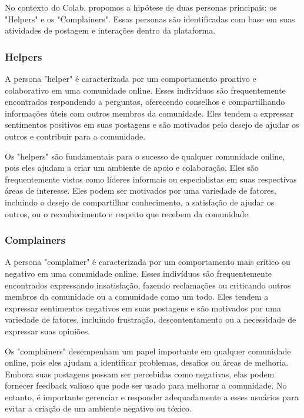No contexto do Colab, propomos a hipótese de duas personas principais: os "Helpers" e os "Complainers". Essas personas são identificadas com base em suas atividades de postagem e interações dentro da plataforma.

\subsubsection*{Helpers}

A persona "helper" é caracterizada por um comportamento proativo e colaborativo em uma comunidade online. Esses indivíduos são frequentemente encontrados respondendo a perguntas, oferecendo conselhos e compartilhando informações úteis com outros membros da comunidade. Eles tendem a expressar sentimentos positivos em suas postagens e são motivados pelo desejo de ajudar os outros e contribuir para a comunidade.

Os "helpers" são fundamentais para o sucesso de qualquer comunidade online, pois eles ajudam a criar um ambiente de apoio e colaboração. Eles são frequentemente vistos como líderes informais ou especialistas em suas respectivas áreas de interesse. Eles podem ser motivados por uma variedade de fatores, incluindo o desejo de compartilhar conhecimento, a satisfação de ajudar os outros, ou o reconhecimento e respeito que recebem da comunidade.

\subsubsection*{Complainers}

A persona "complainer" é caracterizada por um comportamento mais crítico ou negativo em uma comunidade online. Esses indivíduos são frequentemente encontrados expressando insatisfação, fazendo reclamações ou criticando outros membros da comunidade ou a comunidade como um todo. Eles tendem a expressar sentimentos negativos em suas postagens e são motivados por uma variedade de fatores, incluindo frustração, descontentamento ou a necessidade de expressar suas opiniões.

Os "complainers" desempenham um papel importante em qualquer comunidade online, pois eles ajudam a identificar problemas, desafios ou áreas de melhoria. Embora suas postagens possam ser percebidas como negativas, elas podem fornecer feedback valioso que pode ser usado para melhorar a comunidade. No entanto, é importante gerenciar e responder adequadamente a esses usuários para evitar a criação de um ambiente negativo ou tóxico.

